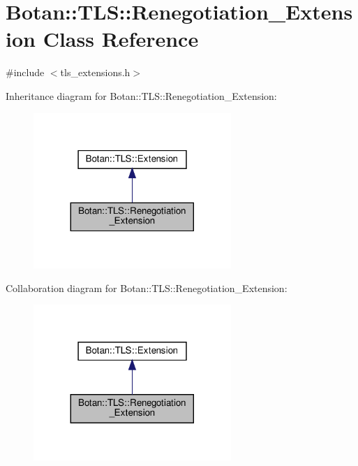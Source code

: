\hypertarget{class_botan_1_1_t_l_s_1_1_renegotiation___extension}{}\section{Botan\+:\+:T\+LS\+:\+:Renegotiation\+\_\+\+Extension Class Reference}
\label{class_botan_1_1_t_l_s_1_1_renegotiation___extension}


{\ttfamily \#include $<$tls\+\_\+extensions.\+h$>$}



Inheritance diagram for Botan\+:\+:T\+LS\+:\+:Renegotiation\+\_\+\+Extension\+:
\nopagebreak
\begin{figure}[H]
\begin{center}
\leavevmode
\includegraphics[width=212pt]{class_botan_1_1_t_l_s_1_1_renegotiation___extension__inherit__graph}
\end{center}
\end{figure}


Collaboration diagram for Botan\+:\+:T\+LS\+:\+:Renegotiation\+\_\+\+Extension\+:
\nopagebreak
\begin{figure}[H]
\begin{center}
\leavevmode
\includegraphics[width=212pt]{class_botan_1_1_t_l_s_1_1_renegotiation___extension__coll__graph}
\end{center}
\end{figure}
